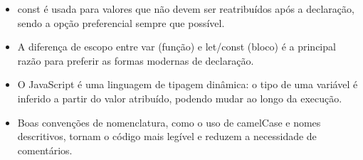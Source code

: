 \begin{itemize}
  \item const é usada para valores que não devem ser reatribuídos após a declaração, sendo a opção preferencial sempre que possível.
\end{itemize}

\begin{itemize}
  \item A diferença de escopo entre var (função) e let/const (bloco) é a principal razão para preferir as formas modernas de declaração.
\end{itemize}

\begin{itemize}
  \item O JavaScript é uma linguagem de tipagem dinâmica: o tipo de uma variável é inferido a partir do valor atribuído, podendo mudar ao longo da execução.
\end{itemize}

\begin{itemize}
  \item Boas convenções de nomenclatura, como o uso de camelCase e nomes descritivos, tornam o código mais legível e reduzem a necessidade de comentários.
\end{itemize}
